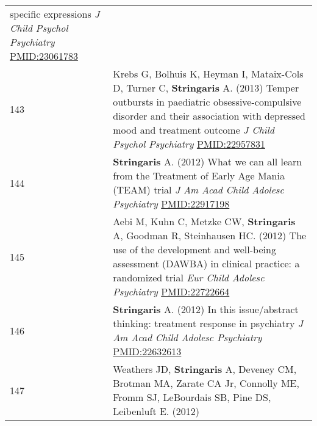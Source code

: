 \documentclass[
]{article}
\begin{document}
\begin{longtable}[]{@{}ll@{}}
\begin{minipage}[t]{0.94\columnwidth}
specific expressions \emph{J Child Psychol Psychiatry}
\url{PMID:23061783}\strut
\end{minipage}\tabularnewline
\begin{minipage}[t]{0.01\columnwidth}\raggedright
143\strut
\end{minipage} & \begin{minipage}[t]{0.94\columnwidth}\raggedright
Krebs G, Bolhuis K, Heyman I, Mataix-Cols D, Turner C,
\textbf{Stringaris} A. (2013) Temper outbursts in paediatric
obsessive-compulsive disorder and their association with depressed mood
and treatment outcome \emph{J Child Psychol Psychiatry}
\url{PMID:22957831}\strut
\end{minipage}\tabularnewline
\begin{minipage}[t]{0.01\columnwidth}\raggedright
144\strut
\end{minipage} & \begin{minipage}[t]{0.94\columnwidth}\raggedright
\textbf{Stringaris} A. (2012) What we can all learn from the Treatment
of Early Age Mania (TEAM) trial \emph{J Am Acad Child Adolesc
Psychiatry} \url{PMID:22917198}\strut
\end{minipage}\tabularnewline
\begin{minipage}[t]{0.01\columnwidth}\raggedright
145\strut
\end{minipage} & \begin{minipage}[t]{0.94\columnwidth}\raggedright
Aebi M, Kuhn C, Metzke CW, \textbf{Stringaris} A, Goodman R, Steinhausen
HC. (2012) The use of the development and well-being assessment (DAWBA)
in clinical practice: a randomized trial \emph{Eur Child Adolesc
Psychiatry} \url{PMID:22722664}\strut
\end{minipage}\tabularnewline
\begin{minipage}[t]{0.01\columnwidth}\raggedright
146\strut
\end{minipage} & \begin{minipage}[t]{0.94\columnwidth}\raggedright
\textbf{Stringaris} A. (2012) In this issue/abstract thinking: treatment
response in psychiatry \emph{J Am Acad Child Adolesc Psychiatry}
\url{PMID:22632613}\strut
\end{minipage}\tabularnewline
\begin{minipage}[t]{0.01\columnwidth}\raggedright
147\strut
\end{minipage} & \begin{minipage}[t]{0.94\columnwidth}\raggedright
Weathers JD, \textbf{Stringaris} A, Deveney CM, Brotman MA, Zarate CA
Jr, Connolly ME, Fromm SJ, LeBourdais SB, Pine DS, Leibenluft E. (2012)

\end{minipage}
\end{longtable}
\end{document}
